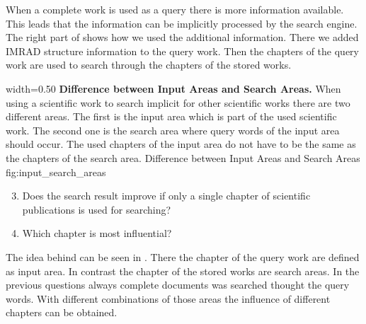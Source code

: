When a complete work is used as a query there is more information available. This leads that the information can be implicitly processed by the search engine. The right part of  shows how we used the additional information. There we added IMRAD structure information to the query work. Then the chapters of the query work are used to search through the chapters of the stored works.

      {width=0.50\textwidth}
      {\textbf{Difference between Input Areas and Search Areas.} When using a scientific work to search implicit for other scientific works there are two different areas. The first is the input area which is part of the used scientific work. The second one is the search area where query words of the input area should occur. The used chapters of the input area do not have to be the same as the chapters of the search area.}
      {Difference between Input Areas and Search Areas}
      {fig:input_search_areas}

\begin{enumerate}[label=1.\arabic*]
  \setcounter{enumi}{2}
    \item Does the search result improve if only a single chapter of scientific publications is used for searching?
    \item Which chapter is most influential?
\end{enumerate}

The idea behind can be seen in . There the chapter of the query work are defined as input area. In contrast the chapter of the stored works are search areas. In the previous questions always complete documents was searched thought the query words. With different combinations of those areas the influence of different chapters can be obtained.
